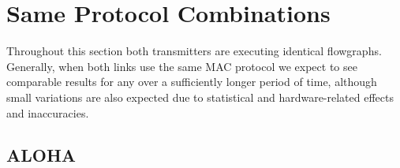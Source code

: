 \section{Same Protocol Combinations}
\label{sec:same-protocols}

Throughout this section both transmitters are executing identical flowgraphs. Generally, when both links use the same MAC protocol we expect to see comparable results for any over a sufficiently longer period of time, although small variations are also expected due to statistical and hardware-related effects and inaccuracies. 

\subsection{ALOHA}
\label{sec:dbl-aloha}

